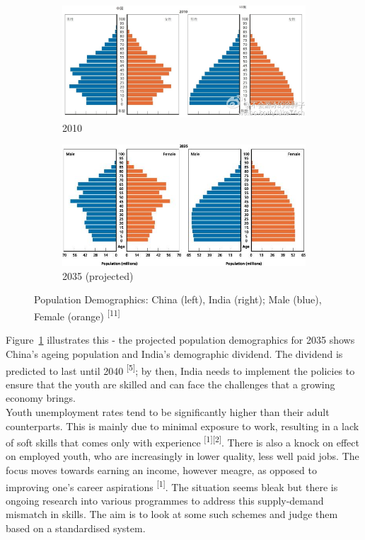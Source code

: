 \documentclass[a4paper, 10pt]{article}
\begin{document}
\begin{figure}[H]
	\centering
		\begin{subfigure}[b]{0.75\textwidth}
			\includegraphics[scale=0.60]{demographics2010.jpg}
			\caption{2010}
		\end{subfigure}
		\begin{subfigure}[b]{0.75\textwidth}		
			\includegraphics[scale=0.44]{demographics2035.jpg}
			\caption{2035 (projected)}
		\end{subfigure}
	\caption{Population Demographics: China (left), India (right); Male (blue), Female (orange) \textsuperscript{[11]}}
    \label{fig:demographics}
\end{figure}

\noindent Figure~\ref{fig:demographics} illustrates this - the projected population demographics for 2035 shows China's ageing population and India's demographic dividend. The dividend is predicted to last until 2040 \textsuperscript{[5]}; by then, India needs to implement the policies to ensure that the youth are skilled and can face the challenges that a growing economy brings. \\

\noindent Youth unemployment rates tend to be significantly higher than their adult counterparts. This is mainly due to minimal exposure to work, resulting in a lack of soft skills that comes only with experience \textsuperscript{[1][2]}. There is also a knock on effect on employed youth, who are increasingly in lower quality, less well paid jobs. The focus moves towards  earning an income, however meagre, as opposed to improving one's career aspirations \textsuperscript{[1]}. The situation seems bleak but there is ongoing research into various programmes to address this supply-demand mismatch in skills. The aim is to look at some such schemes and judge them based on a standardised system.  
\end{document}
